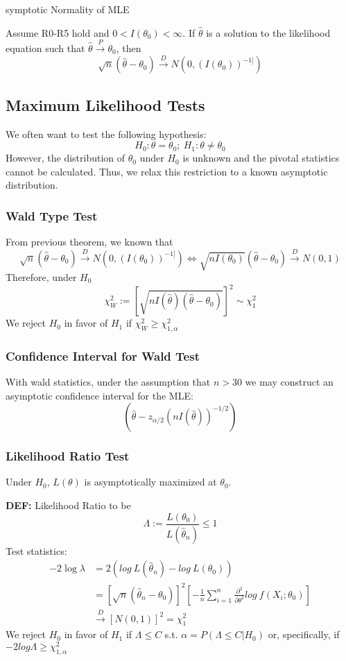 \documentclass[9pt]{article}
\newcommand{\de}{\textbf{DEF: }}
\newenvironment{theorem}[2][Theorem]{\begin{trivlist}
\item[\hskip \labelsep {\bfseries #1}\hskip \labelsep {\bfseries #2}]}{\end{trivlist}}
\begin{document}
\begin{theorem}Asymptotic Normality of MLE

Assume R0-R5 hold and $0<I(\theta_0)<\infty$. If $\hat \theta$ is a solution to the likelihood equation such that $\hat \theta \overset{P}{\to} \theta_0$, then
$$
    \sqrt{n}(\hat \theta - \theta_0) \overset{D}{\to} N(0, (I(\theta_0))^{-1]})
$$
\end{theorem}

\subsection{Maximum Likelihood Tests}
We often want to test the following hypothesis:
$$
    H_0: \theta = \theta_0 ;\ H_1: \theta \not = \theta_0
$$
However, the distribution of $\theta_0$ under $H_0$ is unknown and the pivotal statistics cannot be calculated. Thus, we relax this restriction to a known asymptotic distribution.

\subsubsection{Wald Type Test}
From previous theorem, we known that
$$
    \sqrt{n}(\hat \theta - \theta_0) \overset{D}{\to} N(0, (I(\theta_0))^{-1]}) \iff \sqrt{nI(\theta_0)}(\hat \theta - \theta_0) \overset{D}{\to} N(0,1)
$$
Therefore, under $H_0$
$$
    \chi^2_{W} := [\sqrt{nI(\hat \theta)(\hat \theta -\theta_0)}]^2 \sim \chi^2_1 
$$
We reject $H_0$ in favor of $H_1$ if $\chi^2_{W} \ge \chi^2_{1,\alpha}$

\subsubsection{Confidence Interval for Wald Test}
With wald statistics, under the assumption that $n>30$ we may construct an asymptotic confidence interval for the MLE:
$$
(\hat \theta -z_{\alpha/2}(nI(\hat \theta))^{-1/2})
$$

\subsubsection{Likelihood Ratio Test}
Under $H_0$, $L(\theta)$ is asymptotically maximized at $\theta_0$. 

\de Likelihood Ratio to be 
$$
\Lambda := \frac{L(\theta_0)}{L(\hat \theta_n)} \le 1
$$
Test statistics:
\begin{align*}
    -2\log\lambda &= 2(log\ L(\hat \theta_n) - log\ L(\theta_0))\\
    &= [\sqrt{n}(\hat \theta_n -\theta_0)]^2 \left[ -\frac{1}{n}\sum_{i=1}^{n}\frac{\partial^2}{\partial \theta^2}log\ f(X_i;\theta_0) \right]\\
    &\overset{D}{\to} \left[ N(0,1) \right]^2 = \chi^2_1
\end{align*}
We reject $H_0$ in favor of $H_1$ if $\Lambda \le C$ s.t. $\alpha = P(\Lambda \le C|H_0)$ or, specifically, if $-2log\Lambda \ge \chi^2_{1,\alpha}$
\end{document}
